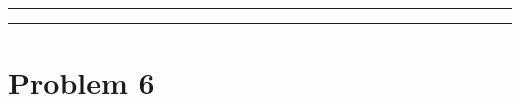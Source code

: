 \documentclass{article}
\theoremstyle{definition}
\newenvironment{solution}{\bigskip\hrule{\hfill}}{\bigskip\hrule{\hfill}} %
\begin{document}
\begin{solution}




\end{solution}


\newpage


\section*{Problem 6}
\end{document}

